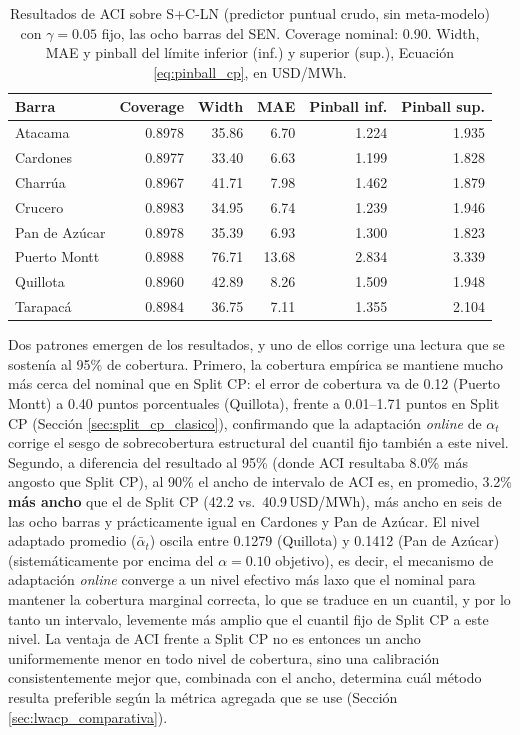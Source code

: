 \begin{table}[htbp]
    \centering
    \small
    \begin{tabular}{lrrrrr}
        \toprule
        Barra & Coverage & Width & MAE & Pinball inf. & Pinball sup. \\
        \midrule
        Atacama       & 0.8978 & 35.86 & 6.70  & 1.224 & 1.935 \\
        Cardones      & 0.8977 & 33.40 & 6.63  & 1.199 & 1.828 \\
        Charrúa       & 0.8967 & 41.71 & 7.98  & 1.462 & 1.879 \\
        Crucero       & 0.8983 & 34.95 & 6.74  & 1.239 & 1.946 \\
        Pan de Azúcar & 0.8978 & 35.39 & 6.93  & 1.300 & 1.823 \\
        Puerto Montt  & 0.8988 & 76.71 & 13.68 & 2.834 & 3.339 \\
        Quillota      & 0.8960 & 42.89 & 8.26  & 1.509 & 1.948 \\
        Tarapacá      & 0.8984 & 36.75 & 7.11  & 1.355 & 2.104 \\
        \bottomrule
    \end{tabular}
    \caption{Resultados de ACI sobre S+C-LN (predictor puntual crudo, sin meta-modelo) con $\gamma = 0.05$ fijo, las ocho barras del SEN. Coverage nominal: 0.90. Width, MAE y pinball del límite inferior (inf.) y superior (sup.), Ecuación \ref{eq:pinball_cp}, en USD/MWh.}
    \label{tab:aci_ln_resultados}
\end{table}

Dos patrones emergen de los resultados, y uno de ellos corrige una lectura que se sostenía al 95\% de cobertura. Primero, la cobertura empírica se mantiene mucho más cerca del nominal que en Split CP: el error de cobertura va de 0.12 (Puerto Montt) a 0.40 puntos porcentuales (Quillota), frente a 0.01--1.71 puntos en Split CP (Sección \ref{sec:split_cp_clasico}), confirmando que la adaptación \textit{online} de $\alpha_t$ corrige el sesgo de sobrecobertura estructural del cuantil fijo también a este nivel. Segundo, a diferencia del resultado al 95\% (donde ACI resultaba 8.0\% más angosto que Split CP), al 90\% el ancho de intervalo de ACI es, en promedio, 3.2\% \textbf{más ancho} que el de Split CP (42.2 vs.\ 40.9\,USD/MWh), más ancho en seis de las ocho barras y prácticamente igual en Cardones y Pan de Azúcar. El nivel adaptado promedio ($\bar\alpha_t$) oscila entre 0.1279 (Quillota) y 0.1412 (Pan de Azúcar) (sistemáticamente por encima del $\alpha=0.10$ objetivo), es decir, el mecanismo de adaptación \textit{online} converge a un nivel efectivo más laxo que el nominal para mantener la cobertura marginal correcta, lo que se traduce en un cuantil, y por lo tanto un intervalo, levemente más amplio que el cuantil fijo de Split CP a este nivel. La ventaja de ACI frente a Split CP no es entonces un ancho uniformemente menor en todo nivel de cobertura, sino una calibración consistentemente mejor que, combinada con el ancho, determina cuál método resulta preferible según la métrica agregada que se use (Sección \ref{sec:lwacp_comparativa}).

